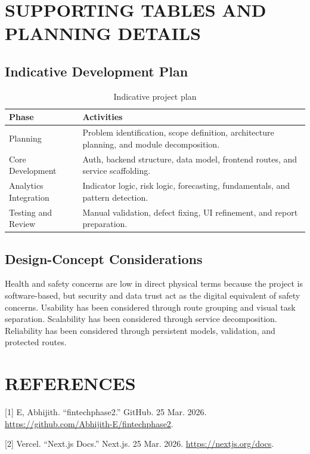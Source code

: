\documentclass[12pt,a4paper]{report}
\begin{document}
\chapter{SUPPORTING TABLES AND PLANNING DETAILS}
\section{Indicative Development Plan}
\begin{table}[H]
\centering
\caption{Indicative project plan}
\begin{tabularx}{\textwidth}{>{\raggedright\arraybackslash}p{1.8in} X}
\toprule
\textbf{Phase} & \textbf{Activities} \\
\midrule
Planning & Problem identification, scope definition, architecture planning, and module decomposition. \\
Core Development & Auth, backend structure, data model, frontend routes, and service scaffolding. \\
Analytics Integration & Indicator logic, risk logic, forecasting, fundamentals, and pattern detection. \\
Testing and Review & Manual validation, defect fixing, UI refinement, and report preparation. \\
\bottomrule
\end{tabularx}
\end{table}

\section{Design-Concept Considerations}
Health and safety concerns are low in direct physical terms because the project is software-based, but security and data trust act as the digital equivalent of safety concerns. Usability has been considered through route grouping and visual task separation. Scalability has been considered through service decomposition. Reliability has been considered through persistent models, validation, and protected routes.

\chapter*{REFERENCES}
[1] E, Abhijith. ``fintechphase2.'' GitHub. 25 Mar. 2026. \url{https://github.com/Abhijith-E/fintechphase2}.

[2] Vercel. ``Next.js Docs.'' Next.js. 25 Mar. 2026. \url{https://nextjs.org/docs}.
\end{document}
